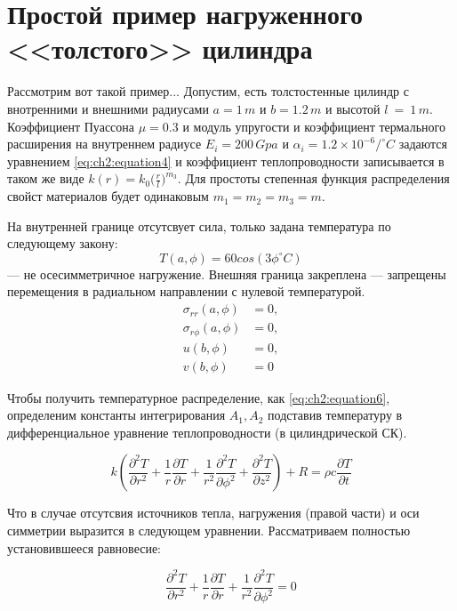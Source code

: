\chapter{Простой пример нагруженного <<толстого>> цилиндра} \label{ch:example1}

Рассмотрим вот такой пример...
Допустим, есть толстостенные цилиндр с внотренними и внешними радиусами \(a=1\,m\) и \(b=1.2\,m\) и высотой \(l~=~1\,m\). Коэффициент Пуассона \(\mu=0.3\) и модуль упругости и коэффициент термального расширения на внутреннем радиусе \(E_i = 200\,Gpa\) и \(\alpha_i = 1.2 \times 10^{-6} /^{\circ}C\) задаются уравнением \cref{eq:ch2:equation4} и коэффициент теплопроводности записывается в таком же виде \( k(r) = k_0 \big ( \frac{r}{l} \big ) ^ {m_3} \). Для простоты степенная функция распределения свойст материалов будет одинаковым \(m_1=m_2=m_3=m\).

На внутренней границе отсутсвует сила, только задана температура по следующему закону:
\begin{equation}
\label{eq:example1:1}
	T(a, \phi) = 60 cos (3\phi^{\circ}C)
\end{equation}
 --- не осесимметричное нагружение. Внешняя граница закреплена --- запрещены перемещения в радиальном направлении с нулевой температурой. 
\begin{equation}
\label{eq:example1:2}
\begin{split}
	\sigma_{rr}(a, \phi) &= 0,\\
	\sigma_{r\phi}(a, \phi) &= 0,\\
	u(b, \phi) &= 0,\\
	v(b, \phi) &= 0
\end{split}
\end{equation}

Чтобы получить температурное распределение, как \cref{eq:ch2:equation6}, определеним константы интегрирования \(A_1, A_2\) подставив температуру в дифференциальное уравнение теплопроводности (в цилиндрической СК).

\begin{equation}
\label{eq:example1:3}
	k \left(\frac{\partial^2 T}{\partial r^2} +\frac{1}{r}\frac{\partial T}{\partial r} +\frac{1}{r^2}\frac{\partial^2 T}{\partial \phi^2} +\frac{\partial^2 T}{\partial z^2} \right) +R = \rho c \frac{\partial T}{\partial t}
\end{equation}

Что в случае отсутсвия источников тепла, нагружения (правой части) и оси симметрии выразится в следующем уравнении. Рассматриваем полностью установившееся равновесие:

\begin{equation}
\label{eq:example1:4}
	\frac{\partial^2 T}{\partial r^2} + \frac{1}{r} \frac{\partial T}{\partial r} +\frac{1}{r^2} \frac{\partial ^2 T}{\partial \phi^2} = 0
\end{equation}